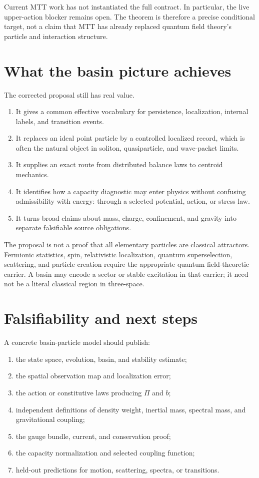 \documentclass[11pt]{article}
\begin{document}
Current MTT work has not instantiated the full contract.  In particular, the
live upper-action blocker remains open.  The theorem is therefore a precise
conditional target, not a claim that MTT has already replaced quantum field
theory's particle and interaction structure.

\section{What the basin picture achieves}

The corrected proposal still has real value.
\begin{enumerate}
\item It gives a common effective vocabulary for persistence, localization,
internal labels, and transition events.
\item It replaces an ideal point particle by a controlled localized record,
which is often the natural object in soliton, quasiparticle, and wave-packet
limits.
\item It supplies an exact route from distributed balance laws to centroid
mechanics.
\item It identifies how a capacity diagnostic may enter physics without
confusing admissibility with energy: through a selected potential, action, or
stress law.
\item It turns broad claims about mass, charge, confinement, and gravity into
separate falsifiable source obligations.
\end{enumerate}

The proposal is not a proof that all elementary particles are classical
attractors.  Fermionic statistics, spin, relativistic localization, quantum
superselection, scattering, and particle creation require the appropriate
quantum field-theoretic carrier.  A basin may encode a sector or stable
excitation in that carrier; it need not be a literal classical region in
three-space.

\section{Falsifiability and next steps}

A concrete basin-particle model should publish:
\begin{enumerate}
\item the state space, evolution, basin, and stability estimate;
\item the spatial observation map and localization error;
\item the action or constitutive laws producing $\Pi$ and $b$;
\item independent definitions of density weight, inertial mass, spectral
mass, and gravitational coupling;
\item the gauge bundle, current, and conservation proof;
\item the capacity normalization and selected coupling function;
\item held-out predictions for motion, scattering, spectra, or transitions.
\end{enumerate}
\end{document}
